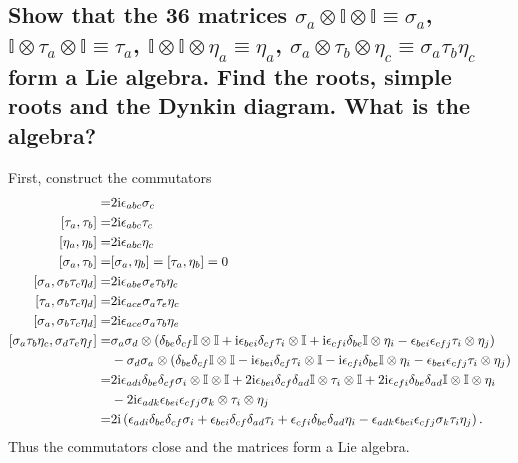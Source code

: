 \documentclass[main.tex]{subfiles}
\begin{document}
\subsection{Show that the 36 matrices $\sigma_a\otimes\mathbb{I}\otimes\mathbb{I}\equiv\sigma_a$, $\mathbb{I}\otimes\tau_a\otimes\mathbb{I}\equiv\tau_a$, $\mathbb{I}\otimes\mathbb{I}\otimes\eta_a\equiv\eta_a$, $\sigma_a\otimes\tau_b\otimes\eta_c\equiv\sigma_a\tau_b\eta_c$ form a Lie algebra. Find the roots, simple roots and the Dynkin diagram. What is the algebra?}
First, construct the commutators
\begin{align}
[\sigma_a,\sigma_b]=&2\img\epsilon_{abc}\sigma_c\\
[\tau_a,\tau_b]=&2\img\epsilon_{abc}\tau_c\\
[\eta_a,\eta_b]=&2\img\epsilon_{abc}\eta_c\\
[\sigma_a,\tau_b]=&[\sigma_a,\eta_b]=[\tau_a,\eta_b]=0\\
[\sigma_a,\sigma_b\tau_c\eta_d]=&2\img\epsilon_{abe}\sigma_e\tau_b\eta_c\\
[\tau_a,\sigma_b\tau_c\eta_d]=&2\img\epsilon_{ace}\sigma_a\tau_e\eta_c\\
[\sigma_a,\sigma_b\tau_c\eta_d]=&2\img\epsilon_{ace}\sigma_a\tau_b\eta_e\\
[\sigma_a\tau_b\eta_c,\sigma_d\tau_e\eta_f]=&\sigma_a\sigma_d\otimes(\delta_{be}\delta_{cf}\mathbb{I}\otimes\mathbb{I}+\img\epsilon_{bei}\delta_{cf}\tau_i\otimes\mathbb{I}+\img\epsilon_{cfi}\delta_{be}\mathbb{I}\otimes\eta_i-\epsilon_{bei}\epsilon_{cfj}\tau_i\otimes\eta_j)\nonumber\\
&-\sigma_d\sigma_a\otimes(\delta_{be}\delta_{cf}\mathbb{I}\otimes\mathbb{I}-\img\epsilon_{bei}\delta_{cf}\tau_i\otimes\mathbb{I}-\img\epsilon_{cfi}\delta_{be}\mathbb{I}\otimes\eta_i-\epsilon_{bei}\epsilon_{cfj}\tau_i\otimes\eta_j)\\
=&2\img\epsilon_{adi}\delta_{be}\delta_{cf}\sigma_i\otimes\mathbb{I}\otimes\mathbb{I}+2\img\epsilon_{bei}\delta_{cf}\delta_{ad}\mathbb{I}\otimes\tau_{i}\otimes\mathbb{I}+2\img\epsilon_{cfi}\delta_{be}\delta_{ad}\mathbb{I}\otimes\mathbb{I}\otimes\eta_i\nonumber\\
&-2\img\epsilon_{adk}\epsilon_{bei}\epsilon_{cfj}\sigma_k\otimes\tau_i\otimes\eta_j\\
=&2\img\left(\epsilon_{adi}\delta_{be}\delta_{cf}\sigma_i  + \epsilon_{bei}\delta_{cf}\delta_{ad}\tau_{i} +  \epsilon_{cfi}\delta_{be}\delta_{ad}\eta_i -\epsilon_{adk}\epsilon_{bei}\epsilon_{cfj}\sigma_k\tau_i\eta_j  \right).
\end{align}
Thus the commutators close and the matrices form a Lie algebra.
\end{document}
